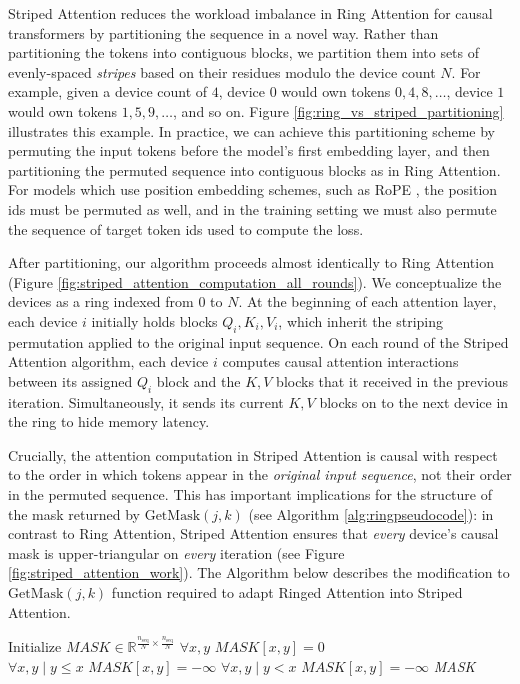 Striped Attention reduces the workload imbalance in Ring Attention for causal transformers by partitioning the sequence in a novel way. Rather than partitioning the tokens into contiguous blocks, we partition them into sets of evenly-spaced \emph{stripes} based on their residues modulo the device count $N$. For example, given a device count of $4$, device $0$ would own tokens $0, 4, 8, \ldots$, device $1$ would own tokens $1, 5, 9, \ldots$, and so on. Figure \ref{fig:ring_vs_striped_partitioning} illustrates this example. In practice, we can achieve this partitioning scheme by permuting the input tokens before the model's first embedding layer, and then partitioning the permuted sequence into contiguous blocks as in Ring Attention. For models which use position embedding schemes, such as RoPE \cite{rope-paper}, the position ids must be permuted as well, and in the training setting we must also permute the sequence of target token ids used to compute the loss.

After partitioning, our algorithm proceeds almost identically to Ring Attention (Figure \ref{fig:striped_attention_computation_all_rounds}). We conceptualize the devices as a ring indexed from $0$ to $N$. At the beginning of each attention layer, each device $i$ initially holds blocks $Q_i, K_i, V_i$, which inherit the striping permutation applied to the original input sequence. On each round of the Striped Attention algorithm, each device $i$ computes causal attention interactions between its assigned $Q_i$ block and the $K, V$ blocks that it received in the previous iteration. Simultaneously, it sends its current $K, V$ blocks on to the next device in the ring to hide memory latency.

Crucially, the attention computation in Striped Attention is causal with respect to the order in which tokens appear in the \emph{original input sequence}, not their order in the permuted sequence. This has important implications for the structure of the mask returned by $\text{GetMask}(j, k)$ (see Algorithm \ref{alg:ringpseudocode}): in contrast to Ring Attention, Striped Attention ensures that \emph{every} device's causal mask is upper-triangular on \emph{every} iteration (see Figure \ref{fig:striped_attention_work}). The Algorithm below describes the modification to $\text{GetMask}(j, k)$ function required to adapt Ringed Attention into Striped Attention.

\begin{samepage}
\hrulefill

    \begin{algorithmic}
        \State Initialize $\textit{MASK} \in \mathbb{R}^{\frac{n_\text{seq}}{N}\times \frac{n_\text{seq}}{N}}$ 
        \State $\forall x,y \textit{ MASK}[x,y] = 0$ 
            \State $\forall x,y \mid y \leq x \textit{ MASK}[x,y] = -\infty$
            \State $\forall x,y \mid y<x \textit{ MASK}[x,y] = -\infty$
        \EndIf
        \State \Return \textit{MASK}
        \EndProcedure
    \end{algorithmic}
    \hrulefill
\end{samepage}

